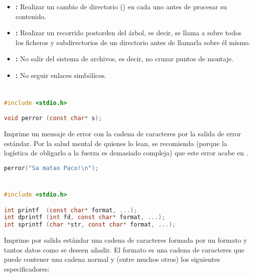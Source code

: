 \begin{itemize}
	\item{}\textbf{:} Realizar un cambio de directorio () en cada uno antes de procesar su contenido.
	\item{}\textbf{:} Realizar un recorrido postorden del árbol, es decir, se llama a  sobre todos los ficheros y subdirectorios de un directorio antes de llamarla sobre él mismo.
	\item{}\textbf{:} No salir del sistema de archivos, es decir, no cruzar puntos de montaje.
	\item{}\textbf{:} No seguir enlaces simbólicos.
\end{itemize}

\section{}

\begin{lstlisting}[language=C]
#include <stdio.h>

void perror (const char* s);
\end{lstlisting}

Imprime un mensaje de error con la cadena de caracteres  por la salida de error estándar.
Por la salud mental de quienes lo lean, se recomienda (porque la logística de obligarlo a la fuerza es demasiado compleja) que este error acabe en .

\begin{lstlisting}[language=C]
perror("Sa matao Paco!\n");
\end{lstlisting}

\section{}

\begin{lstlisting}[language=C]
#include <stdio.h>

int printf  (const char* format, ...);
int dprintf (int fd, const char* format, ...);
int sprintf (char *str, const char* format, ...);
\end{lstlisting}

Imprime por salida estándar una cadena de caracteres formada por un formato  y tantos datos como se deseen añadir.
El formato es una cadena de caracteres que puede contener una cadena normal y (entre muchos otros) los siguientes especificadores:

